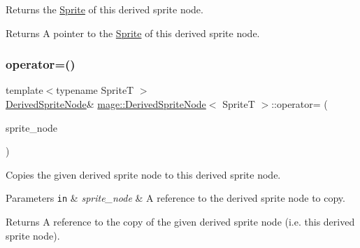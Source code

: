 Returns the \hyperlink{classmage_1_1_sprite}{Sprite} of this derived sprite node.

\begin{DoxyReturn}{Returns}
A pointer to the \hyperlink{classmage_1_1_sprite}{Sprite} of this derived sprite node. 
\end{DoxyReturn}
\hypertarget{classmage_1_1_derived_sprite_node_a1dd542f0e851b1e289bb127691f0800b}{}\label{classmage_1_1_derived_sprite_node_a1dd542f0e851b1e289bb127691f0800b} 
\subsubsection{\texorpdfstring{operator=()}{operator=()}\hspace{0.1cm}{\footnotesize\ttfamily [1/2]}}
{\footnotesize\ttfamily template$<$typename SpriteT $>$ \\
\hyperlink{classmage_1_1_derived_sprite_node}{Derived\+Sprite\+Node}\& \hyperlink{classmage_1_1_derived_sprite_node}{mage\+::\+Derived\+Sprite\+Node}$<$ SpriteT $>$\+::operator= (\begin{DoxyParamCaption}\item[{const \hyperlink{classmage_1_1_derived_sprite_node}{Derived\+Sprite\+Node}$<$ SpriteT $>$ \&}]{sprite\+\_\+node }\end{DoxyParamCaption})\hspace{0.3cm}{\ttfamily [delete]}}

Copies the given derived sprite node to this derived sprite node.


\begin{DoxyParams}[1]{Parameters}
\mbox{\tt in}  & {\em sprite\+\_\+node} & A reference to the derived sprite node to copy. \\
\hline
\end{DoxyParams}
\begin{DoxyReturn}{Returns}
A reference to the copy of the given derived sprite node (i.\+e. this derived sprite node). 
\end{DoxyReturn}
\hypertarget{classmage_1_1_derived_sprite_node_addd4a6c5019df92918e253e41f4e94ac}{}\label{classmage_1_1_derived_sprite_node_addd4a6c5019df92918e253e41f4e94ac} 

